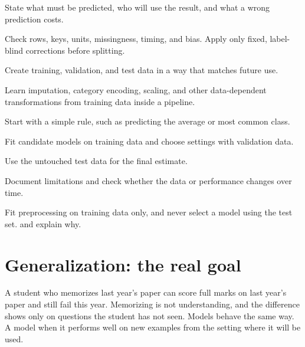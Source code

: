 \begin{utpsteps}
\setlength{\itemsep}{0.12em}
  \item {} State what must be predicted, who will use the result, and what a wrong prediction costs.
  \item {} Check rows, keys, units, missingness, timing, and bias. Apply only fixed, label-blind corrections before splitting.
  \item {} Create training, validation, and test data in a way that matches future use.
  \item {} Learn imputation, category encoding, scaling, and other data-dependent transformations from training data inside a pipeline.
  \item {} Start with a simple rule, such as predicting the average or most common class.
  \item {} Fit candidate models on training data and choose settings with validation data.
  \item {} Use the untouched test data for the final estimate.
  \item {} Document limitations and check whether the data or performance changes over time.
\end{utpsteps}

Fit preprocessing on training data only, and never select a model using the test set.  and  explain why.

\section{Generalization: the real goal}

A student who memorizes last year's paper can score full marks on last year's paper and still fail this year. Memorizing is not understanding, and the difference shows only on questions the student has not seen. Models behave the same way. A model  when it performs well on new examples from the setting where it will be used.

